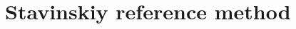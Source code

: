\documentclass[ALICE,manyauthors]{cernphprep}
\begin{document}


\newpage
\appendix
%
\renewcommand{\thesubfigure}{\thefigure(\alph{subfigure})}
\makeatletter
\renewcommand{\p@subfigure}{}
\renewcommand{\@thesubfigure}{(\alph{subfigure})\hskip\subfiglabelskip}
%

\section{Stavinskiy reference method}
\label{App:StavMethod}
\end{document}

